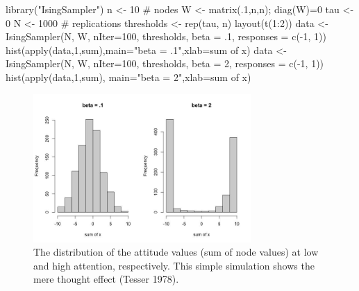 \documentclass[
  letterpaper,
]{scrbook}
\newenvironment{Shaded}{\begin{snugshade}}{\end{snugshade}}
\newcommand{\AttributeTok}[1]{\textcolor[rgb]{0.40,0.45,0.13}{#1}}
\newcommand{\CommentTok}[1]{\textcolor[rgb]{0.37,0.37,0.37}{#1}}
\newcommand{\DecValTok}[1]{\textcolor[rgb]{0.68,0.00,0.00}{#1}}
\newcommand{\FunctionTok}[1]{\textcolor[rgb]{0.28,0.35,0.67}{#1}}
\newcommand{\NormalTok}[1]{\textcolor[rgb]{0.00,0.23,0.31}{#1}}
\newcommand{\OtherTok}[1]{\textcolor[rgb]{0.00,0.23,0.31}{#1}}
\newcommand{\SpecialCharTok}[1]{\textcolor[rgb]{0.37,0.37,0.37}{#1}}
\newcommand{\StringTok}[1]{\textcolor[rgb]{0.13,0.47,0.30}{#1}}
\begin{document}
\begin{Shaded}
\begin{Highlighting}[]
\FunctionTok{library}\NormalTok{(}\StringTok{"IsingSampler"}\NormalTok{)}
\NormalTok{n }\OtherTok{\textless{}{-}} \DecValTok{10} \CommentTok{\# nodes}
\NormalTok{W }\OtherTok{\textless{}{-}} \FunctionTok{matrix}\NormalTok{(.}\DecValTok{1}\NormalTok{,n,n); }\FunctionTok{diag}\NormalTok{(W)}\OtherTok{=}\DecValTok{0}
\NormalTok{tau }\OtherTok{\textless{}{-}} \DecValTok{0}
\NormalTok{N }\OtherTok{\textless{}{-}} \DecValTok{1000} \CommentTok{\# replications}
\NormalTok{thresholds }\OtherTok{\textless{}{-}} \FunctionTok{rep}\NormalTok{(tau, n)}
\FunctionTok{layout}\NormalTok{(}\FunctionTok{t}\NormalTok{(}\DecValTok{1}\SpecialCharTok{:}\DecValTok{2}\NormalTok{))}
\NormalTok{data }\OtherTok{\textless{}{-}} \FunctionTok{IsingSampler}\NormalTok{(N, W, }\AttributeTok{nIter=}\DecValTok{100}\NormalTok{, thresholds, }\AttributeTok{beta =}\NormalTok{ .}\DecValTok{1}\NormalTok{, }\AttributeTok{responses =} \FunctionTok{c}\NormalTok{(}\SpecialCharTok{{-}}\DecValTok{1}\NormalTok{, }\DecValTok{1}\NormalTok{))}
\FunctionTok{hist}\NormalTok{(}\FunctionTok{apply}\NormalTok{(data,}\DecValTok{1}\NormalTok{,sum),}\AttributeTok{main=}\StringTok{"beta = .1"}\NormalTok{,}\AttributeTok{xlab=}\StringTok{\textquotesingle{}sum of x\textquotesingle{}}\NormalTok{)}
\NormalTok{data }\OtherTok{\textless{}{-}} \FunctionTok{IsingSampler}\NormalTok{(N, W, }\AttributeTok{nIter=}\DecValTok{100}\NormalTok{, thresholds, }\AttributeTok{beta =} \DecValTok{2}\NormalTok{, }\AttributeTok{responses =} \FunctionTok{c}\NormalTok{(}\SpecialCharTok{{-}}\DecValTok{1}\NormalTok{, }\DecValTok{1}\NormalTok{))}
\FunctionTok{hist}\NormalTok{(}\FunctionTok{apply}\NormalTok{(data,}\DecValTok{1}\NormalTok{,sum), }\AttributeTok{main=}\StringTok{"beta = 2"}\NormalTok{,}\AttributeTok{xlab=}\StringTok{\textquotesingle{}sum of x\textquotesingle{}}\NormalTok{)}
\end{Highlighting}
\end{Shaded}

\begin{figure}

{\centering \includegraphics[width=3.25752in,height=\textheight]{media/ch6/image12.jpg}

}

\caption{\label{fig-ch6-img12-old-81}The distribution of the attitude
values (sum of node values) at low and high attention, respectively.
This simple simulation shows the mere thought effect (Tesser 1978).}

\end{figure}
\end{document}
